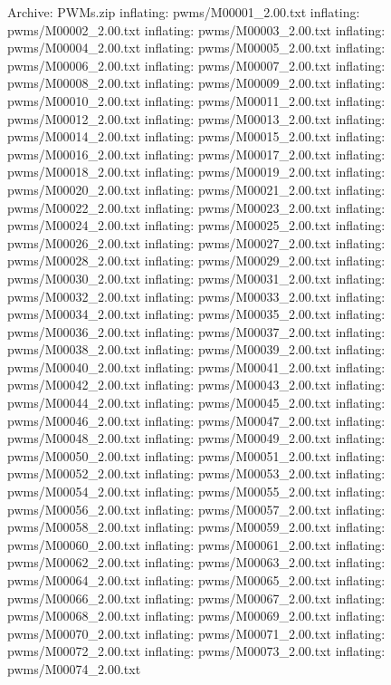 \documentclass[letterpaper,10pt,english]{sphinxmanual}
\begin{document}
{\begin{sphinxVerbatim}[commandchars=\\\{\}]
Archive:  PWMs.zip
  inflating: pwms/M00001\_2.00.txt
  inflating: pwms/M00002\_2.00.txt
  inflating: pwms/M00003\_2.00.txt
  inflating: pwms/M00004\_2.00.txt
  inflating: pwms/M00005\_2.00.txt
  inflating: pwms/M00006\_2.00.txt
  inflating: pwms/M00007\_2.00.txt
  inflating: pwms/M00008\_2.00.txt
  inflating: pwms/M00009\_2.00.txt
  inflating: pwms/M00010\_2.00.txt
  inflating: pwms/M00011\_2.00.txt
  inflating: pwms/M00012\_2.00.txt
  inflating: pwms/M00013\_2.00.txt
  inflating: pwms/M00014\_2.00.txt
  inflating: pwms/M00015\_2.00.txt
  inflating: pwms/M00016\_2.00.txt
  inflating: pwms/M00017\_2.00.txt
  inflating: pwms/M00018\_2.00.txt
  inflating: pwms/M00019\_2.00.txt
  inflating: pwms/M00020\_2.00.txt
  inflating: pwms/M00021\_2.00.txt
  inflating: pwms/M00022\_2.00.txt
  inflating: pwms/M00023\_2.00.txt
  inflating: pwms/M00024\_2.00.txt
  inflating: pwms/M00025\_2.00.txt
  inflating: pwms/M00026\_2.00.txt
  inflating: pwms/M00027\_2.00.txt
  inflating: pwms/M00028\_2.00.txt
  inflating: pwms/M00029\_2.00.txt
  inflating: pwms/M00030\_2.00.txt
  inflating: pwms/M00031\_2.00.txt
  inflating: pwms/M00032\_2.00.txt
  inflating: pwms/M00033\_2.00.txt
  inflating: pwms/M00034\_2.00.txt
  inflating: pwms/M00035\_2.00.txt
  inflating: pwms/M00036\_2.00.txt
  inflating: pwms/M00037\_2.00.txt
  inflating: pwms/M00038\_2.00.txt
  inflating: pwms/M00039\_2.00.txt
  inflating: pwms/M00040\_2.00.txt
  inflating: pwms/M00041\_2.00.txt
  inflating: pwms/M00042\_2.00.txt
  inflating: pwms/M00043\_2.00.txt
  inflating: pwms/M00044\_2.00.txt
  inflating: pwms/M00045\_2.00.txt
  inflating: pwms/M00046\_2.00.txt
  inflating: pwms/M00047\_2.00.txt
  inflating: pwms/M00048\_2.00.txt
  inflating: pwms/M00049\_2.00.txt
  inflating: pwms/M00050\_2.00.txt
  inflating: pwms/M00051\_2.00.txt
  inflating: pwms/M00052\_2.00.txt
  inflating: pwms/M00053\_2.00.txt
  inflating: pwms/M00054\_2.00.txt
  inflating: pwms/M00055\_2.00.txt
  inflating: pwms/M00056\_2.00.txt
  inflating: pwms/M00057\_2.00.txt
  inflating: pwms/M00058\_2.00.txt
  inflating: pwms/M00059\_2.00.txt
  inflating: pwms/M00060\_2.00.txt
  inflating: pwms/M00061\_2.00.txt
  inflating: pwms/M00062\_2.00.txt
  inflating: pwms/M00063\_2.00.txt
  inflating: pwms/M00064\_2.00.txt
  inflating: pwms/M00065\_2.00.txt
  inflating: pwms/M00066\_2.00.txt
  inflating: pwms/M00067\_2.00.txt
  inflating: pwms/M00068\_2.00.txt
  inflating: pwms/M00069\_2.00.txt
  inflating: pwms/M00070\_2.00.txt
  inflating: pwms/M00071\_2.00.txt
  inflating: pwms/M00072\_2.00.txt
  inflating: pwms/M00073\_2.00.txt
  inflating: pwms/M00074\_2.00.txt

\end{sphinxVerbatim}}
\end{document}
